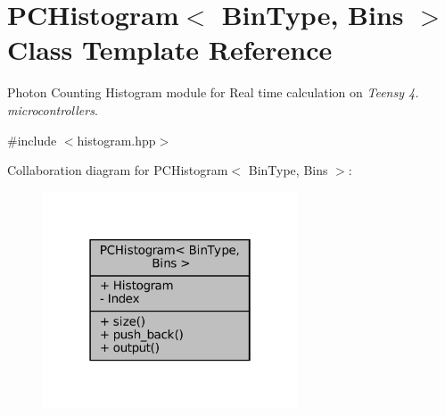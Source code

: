 \hypertarget{classPCHistogram}{}\section{P\+C\+Histogram$<$ Bin\+Type, Bins $>$ Class Template Reference}
\label{classPCHistogram}


Photon Counting Histogram module for Real time calculation on {\itshape Teensy 4. microcontrollers}.  




{\ttfamily \#include $<$histogram.\+hpp$>$}



Collaboration diagram for P\+C\+Histogram$<$ Bin\+Type, Bins $>$\+:\nopagebreak
\begin{figure}[H]
\begin{center}
\leavevmode
\includegraphics[width=214pt]{da/dd0/classPCHistogram__coll__graph}
\end{center}
\end{figure}
